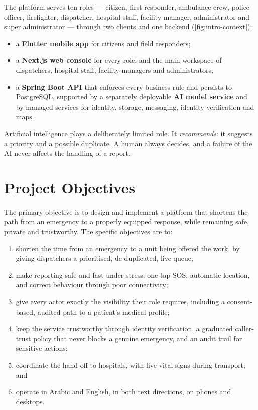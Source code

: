 The platform serves ten roles --- citizen, first responder, ambulance crew, police officer, firefighter,
dispatcher, hospital staff, facility manager, administrator and super administrator --- through two clients and one
backend (\cref{fig:intro-context}):

\begin{itemize}
  \item a \textbf{Flutter mobile app} for citizens and field responders;
  \item a \textbf{Next.js web console} for every role, and the main workspace of dispatchers, hospital staff,
        facility managers and administrators;
  \item a \textbf{Spring Boot API} that enforces every business rule and persists to PostgreSQL, supported by a
        separately deployable \textbf{AI model service} and by managed services for identity, storage, messaging,
        identity verification and maps.
\end{itemize}


Artificial intelligence plays a deliberately limited role. It \emph{recommends}: it suggests a priority and a possible
duplicate. A human always decides, and a failure of the AI never affects the handling of a report.

\section{Project Objectives}

The primary objective is to design and implement a platform that shortens the path from an emergency to a
properly equipped response, while remaining safe, private and trustworthy. The specific objectives are to:

\begin{enumerate}
  \item shorten the time from an emergency to a unit being offered the work, by giving dispatchers a prioritised,
        de-duplicated, live queue;
  \item make reporting safe and fast under stress: one-tap SOS, automatic location, and correct behaviour through
        poor connectivity;
  \item give every actor exactly the visibility their role requires, including a consent-based, audited path to a
        patient's medical profile;
  \item keep the service trustworthy through identity verification, a graduated caller-trust policy that never
        blocks a genuine emergency, and an audit trail for sensitive actions;
  \item coordinate the hand-off to hospitals, with live vital signs during transport; and
  \item operate in Arabic and English, in both text directions, on phones and desktops.
\end{enumerate}

